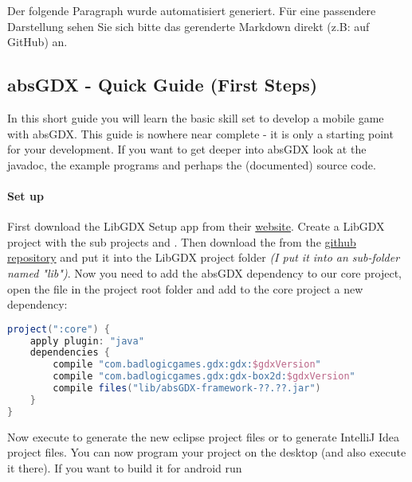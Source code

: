 Der folgende Paragraph wurde automatisiert generiert. Für eine passendere Darstellung sehen Sie sich bitte das gerenderte Markdown direkt (z.B: auf GitHub) an.


\subsection{absGDX - Quick Guide (First Steps)}

In this short guide you will learn the basic skill set to develop a mobile game with absGDX.
This guide is nowhere near complete - it is only a starting point for your development. If you want to get deeper into absGDX look at the javadoc, the example programs and perhaps the (documented) source code.

\paragraph{Set up }

First download the LibGDX Setup app from their \hyperlink{http://libgdx.badlogicgames.com/}{website}. Create a LibGDX project with the sub projects  and .
Then download the  from the \hyperlink{https://github.com/Mikescher/absGDX}{github repository} and put it into the LibGDX project folder \textit{(I put it into an sub-folder named "lib")}.
Now you need to add the absGDX dependency to our core project, open the  file in the project root folder and add to the core project a new dependency:

\doinline
\begin{lstlisting}[caption=Markdown Tutorial: fenced code block, title=\hspace{0 pt}, language=groovy]
project(":core") {
    apply plugin: "java"
    dependencies {
        compile "com.badlogicgames.gdx:gdx:$gdxVersion"
        compile "com.badlogicgames.gdx:gdx-box2d:$gdxVersion"
    	compile files("lib/absGDX-framework-??.??.jar")
    }
}
\end{lstlisting}

Now execute  to generate the new eclipse project files or  to generate IntelliJ Idea project files.
You can now program your project on the desktop (and also execute it there). If you want to build it for android run 

